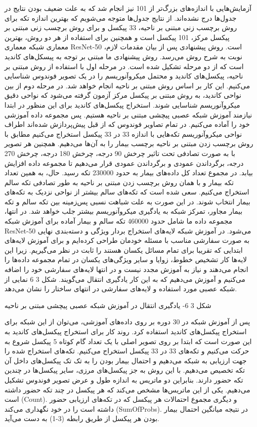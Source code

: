 آزمایش‌هایی با اندازه‌های بزرگ‌تر از 101 نیز انجام شد که به علت ضعیف بودن نتایج در جدول‌ها درج نشده‌اند. از نتایج جدول‌ها متوجه می‌شویم که بهترین اندازه تکه برای روش برچسب زنی مبتنی بر ناحیه، 33 پیکسل و برای روش برچسب زنی مبتنی بر پیکسل مرکز، 101 پیکسل است و همچنین برای استفاده از هر دو روش، بهترین معماری شبکه معماری ResNet-50 است.
روش پیشنهادی
پس از بیان مقدمات لازم، نوبت به شرح روش می‌رسد. روش پیشنهادی ما مبتنی بر توجه به پیسکل‌های کاندید است که از دو مرحله تشکیل شده است. در مرحله اول با استفاده از روش مبتنی بر ناحیه، پیکسل‌های کاندید و محتمل میکروآنوریسم را در یک تصویر فوندوس شناسایی می‌کنیم. این کار بر اساس روش مبتنی بر ناحیه انجام خواهد شد. در مرحله دوم از بین نواحی کاندید، به روش مبتنی بر پیکسل مرکز آزمون گرفته می‌شود که نواحی دقیق میکروآنوریسم شناسایی شوند.
استخراج پیکسل‌های کاندید
برای این منظور در ابتدا نیازمند آموزش شبکه عصبی پیچشی مبتنی بر ناحیه هستیم. پس مجموعه داده آموزشی خود را آماده می‌کنیم. در تمام تصاویر فوندوس که از قبل پیش‌پردازش شده‌اند اطراف نواحی میکروآنوریسم تکه‌هایی با اندازه 33 در 33 پیکسل استخراج می‌کنیم مطابق با روش برچسب زدن مبتنی بر ناحیه برچسب بیمار را به آن‌ها می‌دهیم. همچنین هر تصویر با به صورت تصادفی تحت تاثیر چرخش 90 درجه، چرخش 180 درجه، چرخش 270 درجه، برگرداندن عمودی و برگرداندن عمودی قرار می‌دهیم تا مجموعه داده افزایش بیابد. در مجموع تعداد کل داده‌های بیمار به حدود 230000 تکه رسید.
حال، به همین تعداد تکه بیمار و با همان روش برچسب زدن مبتنی بر ناحیه به طور تصادفی تکه سالم استخراج می‌کنیم. سعی شده است که تکه‌های سالم بیشتر از نواحی نزدیک به تکه‌های بیمار انتخاب شوند. در این صورت به علت شباهت نسبی پس‌زمینه بین تکه سالم و تکه بیمار مجاور، تمرکز شبکه به یادگیری میکروآنوریسم بیشتر جلب خواهد شد.
در انتها، مجموعه داده ما شامل حدود 460000 تکه سالم و بیمار آماده برای آموزش شبکه ResNet-50 می‌شود. در آموزش شبکه لایه‌های استخراج بردار ویژگی و دسته‌بندی نهایی به صورت سفارشی مناسب با مسئله خودمان طراحی کرده‌ایم و برای آموزش لایه‌های ابتدایی که تقریبا برای تمام مسائل یکسان هستند را ثابت در نظر می‌گیریم. زیرا این لایه‌ها کار تشخیص خطوط، زوایا و سایر ویژگی‌های یکسان در تمام مجموعه داده‌ها را انجام می‌دهند و نیاز به آموزش مجدد نیست و در انتها لایه‌های سفارشی خود را اضافه می‌کنیم و آموزش می‌دهیم که به این کار یادگیری انتقال می‌گویند. شکل ‏3 6 نمایی از شبکه عصبی مورد استفاده و لایه‌های سفارشی در انتهای ساختار را نشان می‌دهد. 

 
شکل ‏3 6- یادگیری انتقال در آموزش شبکه عصبی پیچشی مبتنی بر ناحیه

پس از آموزش شبکه در 30 دوره بر روی داده‌های آموزشی، می‌توان از این شبکه برای استخراج پیکسل‌های کاندید استفاده کرد.
روند کار برای استخراج پیکسل‌های کاندید به این صورت است که ابتدا بر روی تصویر اصلی با یک تعداد گام کوتاه 5 پیکسل شروع به حرکت می‌کنیم و تکه‌های 33 در 33 پیکسل استخراج می‌کنیم. تکه‌های استخراج شده را جهت ارزیابی به شبکه می‌دهیم و احتمال بیمار بودن را به تک تک پیکسل‌های داخل آن تکه تخصیص می‌دهیم.
با این روش به جز پیکسل‌های مرزی، سایر پیکسل‌ها در چندین تکه حضور دارند. بنابراین دو ماتریس به اندازه طول و عرض تصویر فوندوس تشکیل می‌دهیم. یکی از این ماتریس‌ها مشخص می‌کند که هر پیکسل در چند تکه‌ حضور داشته است (Count). و دیگری مجموع احتمالات هر پیکسل که در تکه‌های ارزیابی حضور داشته است را در خود نگهداری می‌کند (SumOfProbs). در نتیجه میانگین احتمال بیمار بودن هر پیکسل از طریق رابطه (3-1) به دست می‌آید.

